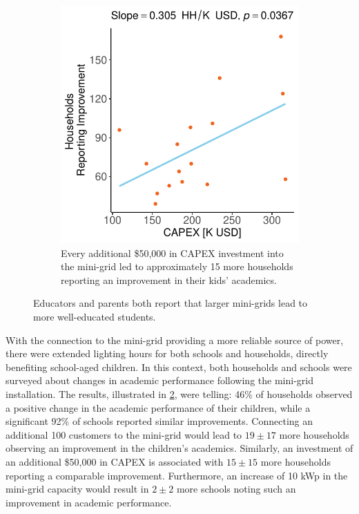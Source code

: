 \begin{figure}[th]
\begin{subfigure}[t]{0.48\textwidth}
		\includegraphics[width=\textwidth]{images/school_performance_change_regression_community.pdf}
		\caption{Every additional \$50,000 in CAPEX investment into the mini-grid led to approximately 15 more households reporting an improvement in their kids' academics.}
		\label{fig:academics_households}
	\end{subfigure}
	\caption{Educators and parents both report that larger mini-grids lead to more well-educated students.}
	\label{fig:academic-performance}
\end{figure}

With the connection to the mini-grid providing a more reliable source of power, there were extended lighting hours for both schools and households, directly benefiting school-aged children. In this context, both households and schools were surveyed about changes in academic performance following the mini-grid installation. The results, illustrated in \cref{fig:academic-performance}, were telling: 46\% of households observed a positive change in the academic performance of their children, while a significant 92\% of schools reported similar improvements. Connecting an additional 100 customers to the mini-grid would lead to $19\pm17$ more households observing an improvement in the children's academics. Similarly, an investment of an additional \$50,000 in CAPEX is associated with $15\pm15$ more households reporting a comparable improvement. Furthermore, an increase of 10 kWp in the mini-grid capacity would result in $2\pm2$ more schools noting such an improvement in academic performance.

